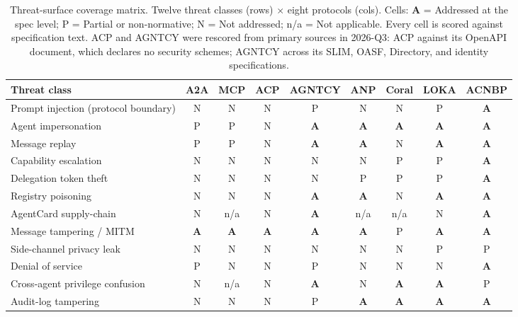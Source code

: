 
\begin{table}[h!]
  \centering
  \caption{Threat-surface coverage matrix. Twelve threat classes (rows) $\times$ eight protocols (cols). Cells: \textbf{A} = Addressed at the spec level; P = Partial or non-normative; N = Not addressed; n/a = Not applicable. Every cell is scored against specification text. ACP and AGNTCY were rescored from primary sources in 2026-Q3: ACP against its OpenAPI document, which declares no security schemes; AGNTCY across its SLIM, OASF, Directory, and identity specifications.}
  \label{tab:threat-surface}
  \footnotesize
  \begin{tabular}{lcccccccc}
    \toprule
    Threat class & A2A & MCP & ACP & AGNTCY & ANP & Coral & LOKA & ACNBP \\
    \midrule
    Prompt injection (protocol boundary) & N & N & N & P & N & N & P & \textbf{A} \\
    Agent impersonation & P & P & N & \textbf{A} & \textbf{A} & \textbf{A} & \textbf{A} & \textbf{A} \\
    Message replay & P & P & N & \textbf{A} & \textbf{A} & N & \textbf{A} & \textbf{A} \\
    Capability escalation & N & N & N & N & N & P & P & \textbf{A} \\
    Delegation token theft & N & N & N & N & P & P & P & \textbf{A} \\
    Registry poisoning & N & N & N & \textbf{A} & \textbf{A} & N & \textbf{A} & \textbf{A} \\
    AgentCard supply-chain & N & n/a & N & \textbf{A} & n/a & n/a & N & \textbf{A} \\
    Message tampering / MITM & \textbf{A} & \textbf{A} & \textbf{A} & \textbf{A} & \textbf{A} & P & \textbf{A} & \textbf{A} \\
    Side-channel privacy leak & N & N & N & N & N & N & P & P \\
    Denial of service & P & N & N & P & N & N & N & \textbf{A} \\
    Cross-agent privilege confusion & N & n/a & N & \textbf{A} & N & \textbf{A} & \textbf{A} & P \\
    Audit-log tampering & N & N & N & P & \textbf{A} & \textbf{A} & \textbf{A} & \textbf{A} \\
    \bottomrule
  \end{tabular}
\end{table}
